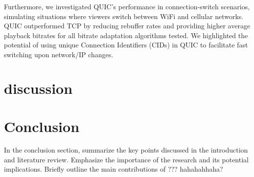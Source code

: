 \documentclass{article}
\begin{document}
Furthermore, we investigated QUIC's performance in connection-switch scenarios, simulating situations where viewers switch between WiFi and cellular networks. QUIC outperformed TCP by reducing rebuffer rates and providing higher average playback bitrates for all bitrate adaptation algorithms tested. We highlighted the potential of using unique Connection Identifiers (CIDs) in QUIC to facilitate fast switching upon network/IP changes.
\section{discussion}

\section{Conclusion}
In the conclusion section, summarize the key points discussed in the introduction and literature review. Emphasize the importance of the research and its potential implications. Briefly outline the main contributions of ???
hahahahhaha?
\end{document}
